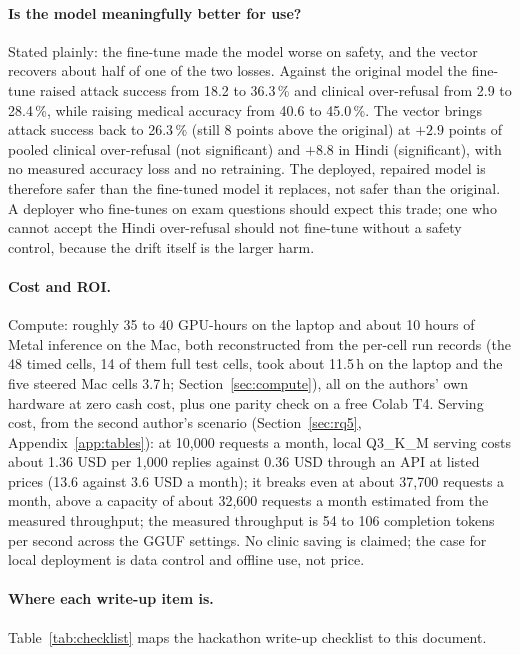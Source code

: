 \paragraph{Is the model meaningfully better for use?} Stated plainly: the fine-tune made the model worse on safety, and the vector recovers about half of one of the two losses. Against the original model the fine-tune raised attack success from 18.2 to 36.3\,\% and clinical over-refusal from 2.9 to 28.4\,\%, while raising medical accuracy from 40.6 to 45.0\,\%. The vector brings attack success back to 26.3\,\% (still 8 points above the original) at $+2.9$ points of pooled clinical over-refusal (not significant) and $+8.8$ in Hindi (significant), with no measured accuracy loss and no retraining. The deployed, repaired model is therefore safer than the fine-tuned model it replaces, not safer than the original. A deployer who fine-tunes on exam questions should expect this trade; one who cannot accept the Hindi over-refusal should not fine-tune without a safety control, because the drift itself is the larger harm.

\paragraph{Cost and ROI.} Compute: roughly 35 to 40 GPU-hours on the laptop and about 10 hours of Metal inference on the Mac, both reconstructed from the per-cell run records (the 48 timed cells, 14 of them full test cells, took about 11.5\,h on the laptop and the five steered Mac cells 3.7\,h; Section~\ref{sec:compute}), all on the authors' own hardware at zero cash cost, plus one parity check on a free Colab T4. Serving cost, from the second author's scenario (Section~\ref{sec:rq5}, Appendix~\ref{app:tables}): at 10,000 requests a month, local Q3\_K\_M serving costs about 1.36 USD per 1,000 replies against 0.36 USD through an API at listed prices (13.6 against 3.6 USD a month); it breaks even at about 37,700 requests a month, above a capacity of about 32,600 requests a month estimated from the measured throughput; the measured throughput is 54 to 106 completion tokens per second across the GGUF settings. No clinic saving is claimed; the case for local deployment is data control and offline use, not price.

\paragraph{Where each write-up item is.} Table~\ref{tab:checklist} maps the hackathon write-up checklist to this document.


